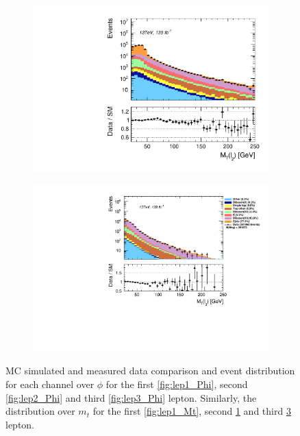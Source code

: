 \begin{figure}[H]
{\begin{subfigure}{.405\textwidth}
        \includegraphics[width=\textwidth]{Figures/FeaturesHistograms/lep2_Mt.pdf}
        \caption{}
        \label{fig:lep2_Mt}
    \end{subfigure}
    \hfill
    \begin{subfigure}{.525\textwidth}
        \includegraphics[width=\textwidth]{Figures/FeaturesHistograms/lep3_Mt.pdf}
        \caption{}
        \label{fig:lep3_Mt}
    \end{subfigure}
    }
    \caption[\acs{MC} simulated and measured data comparison and event distribution for each channel over $\phi$ for the first, 
    second and third lepton. Similarly, the distribution over $m_t$ for the first, second and third lepton.]{\acs{MC} simulated and measured data 
    comparison and event distribution for each channel over $\phi$ for the first \ref{fig:lep1_Phi}, 
    second \ref{fig:lep2_Phi} and third \ref{fig:lep3_Phi} lepton. Similarly, the distribution over $m_t$
    for the first \ref{fig:lep1_Mt}, second \ref{fig:lep2_Mt} and third \ref{fig:lep3_Mt} lepton.}
\end{figure}
